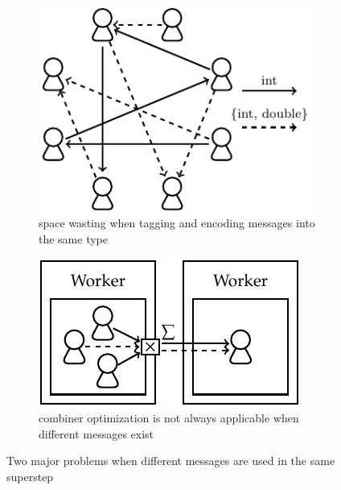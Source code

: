 \documentclass{sokendai_thesis} %
\begin{document}
\begin{figure}[th]
\centering
\begin{subfigure}[b]{0.45\textwidth}
 \includegraphics[width=\textwidth]{figures/multi-msg.pdf}
 \caption{space wasting when tagging and encoding messages into the same type}
 \label{fig:multi-msg}
\end{subfigure}
\hspace{5pt}
\begin{subfigure}[b]{0.45\textwidth}
 \includegraphics[width=\textwidth]{figures/comb-err.pdf}
 \caption{combiner optimization is not always applicable when different messages exist}
 \label{fig:comb-err}
\end{subfigure}
\caption{Two major problems when different messages are used in the same superstep}
\label{fig:multi-msg-example}
\end{figure}
\end{document}
